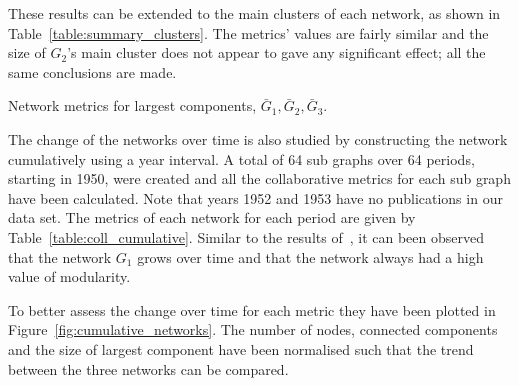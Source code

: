 \documentclass{article}
\theoremstyle{definition}
\begin{document}
These results can be extended to the main clusters of each network, as shown in
Table~\ref{table:summary_clusters}. The metrics' values are fairly similar and
the size of \(G_2\)'s main cluster does not appear to gave any significant
effect; all the same conclusions are made.

\begin{table}[!hbtp]
    \centering
    \resizebox{\textwidth}{!}{
    }
    \caption{Network metrics for largest components, \(\bar{G}_1, \bar{G}_2, \bar{G}_3\).}\label{table:summary_clusters}
\end{table}

The change of the networks over time is also studied by constructing the network
cumulatively using a year interval. A total of 64 sub graphs
over 64 periods, starting in 1950, were created and all the collaborative metrics
for each sub graph have been calculated. Note that years 1952 and 1953 have no
publications in our data set. The metrics of each network for each period are given by
Table~\ref{table:coll_cumulative}.
Similar to the results of~\cite{Liu2015}, it can been observed that the network \(G_1\)
grows over time and that the network always had a high value of modularity.

\begin{table}[!hbtp]
    \centering
    \begin{adjustbox}{totalheight=.8\baselineskip, width=\textwidth}
    }
    \caption{Collaborativeness metrics for cumulative graphs, \(G \subseteq G_1\).}\label{table:coll_cumulative}
\end{adjustbox}
\end{table}

\begin{table}[!hbtp]
    \centering
    \begin{adjustbox}{totalheight=\baselineskip, width=\textwidth}
    }
    \caption{Collaborativeness metrics for cumulative graphs' main clusters, \(G \subseteq \bar{G}_1\).}\label{table:clusters_cumulative}
\end{adjustbox}
\end{table}

To better assess the change over time for each metric they have been plotted in
Figure~\ref{fig:cumulative_networks}. The number of nodes, connected components
and the size of largest component have been normalised such that the trend between
the three networks can be compared.
\end{document}
